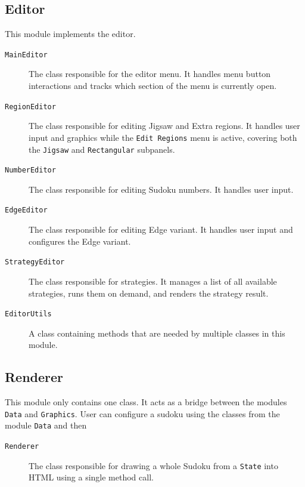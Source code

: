 \subsection*{Editor}

This module implements the editor.

\begin{description}
    \item[\texttt{MainEditor}]
    The class responsible for the editor menu.
    It handles menu button interactions and tracks which section of the menu is currently open.

    \item[\texttt{RegionEditor}]
    The class responsible for editing Jigsaw and Extra regions.
    It handles user input and graphics while the \texttt{Edit Regions} menu is active,
    covering both the \texttt{Jigsaw} and \texttt{Rectangular} subpanels.

    \item[\texttt{NumberEditor}]
    The class responsible for editing Sudoku numbers.
    It handles user input.

    \item[\texttt{EdgeEditor}]
    The class responsible for editing Edge variant.
    It handles user input and configures the Edge variant.

    \item[\texttt{StrategyEditor}]
    The class responsible for strategies.
    It manages a list of all available strategies, runs them on demand, and renders the strategy result.

    \item[\texttt{EditorUtils}]
    A class containing methods that are needed by multiple classes in this module.
\end{description}

\subsection*{Renderer}

This module only contains one class.
It acts as a bridge between the modules \texttt{Data} and \texttt{Graphics}.
User can configure a sudoku using the classes from the module \texttt{Data} and then

\begin{description}
    \item[\texttt{Renderer}]
    The class responsible for drawing a whole Sudoku from a \texttt{State} into HTML using a single method call.
\end{description}

